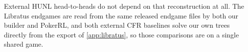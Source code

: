 External HUNL head-to-heads do not depend on that reconstruction at all. The Libratus
endgames are read from the same released endgame files by both our builder and
PokerRL, and both external CFR baselines solve our own trees directly from the export
of \cref{app:libratus}, so those comparisons are on a single shared game.
